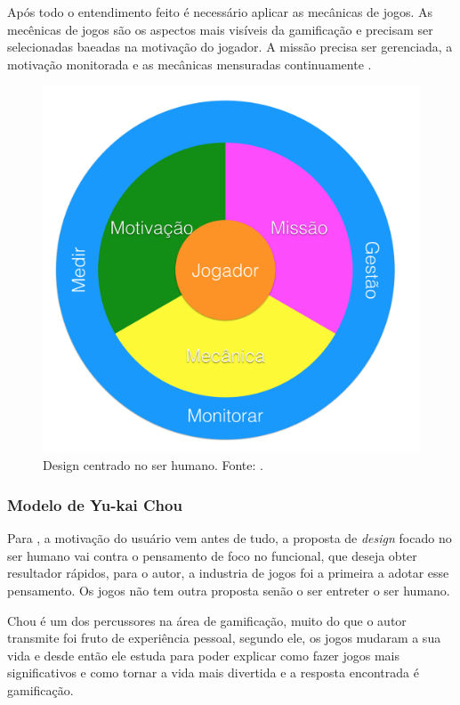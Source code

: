  Após todo o entendimento feito é necessário aplicar as mecânicas de jogos. As mecênicas de jogos são os aspectos mais visíveis da gamificação e precisam ser selecionadas baeadas na motivação do jogador. A missão precisa ser gerenciada, a motivação monitorada e as mecânicas mensuradas continuamente \cite{kumar2013gamification}.

\begin{figure}[h]
	\centering
		\includegraphics[keepaspectratio=true,scale=0.35]{figuras/pcd.png}
	\caption{Design centrado no ser humano. Fonte: \cite{kumar2013gamification}.\label{pcdfig}
}
\end{figure}

\subsubsection{Modelo de Yu-kai Chou}

Para \cite{chou2015actionable}, a motivação do usuário vem antes de tudo, a proposta de \textit{design} focado no ser humano vai contra o pensamento de foco no funcional, que deseja obter resultador rápidos, para o autor, a industria de jogos foi a primeira a adotar esse pensamento. Os jogos não tem outra proposta senão o ser entreter o ser humano.

Chou é um dos percussores na área de gamificação, muito do que o autor transmite foi fruto de experiência pessoal, segundo ele, os jogos mudaram a sua vida e desde então ele estuda para poder explicar como fazer jogos mais significativos e como tornar a vida mais divertida e a resposta encontrada é gamificação. 

